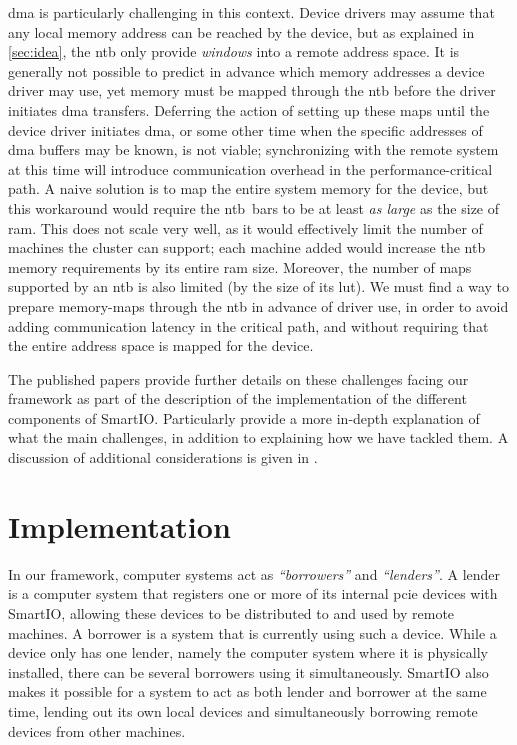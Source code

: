 \Gls{dma} is particularly challenging in this context.
%
Device drivers may assume that any local memory address can be reached by the device, but as explained in \cref{sec:idea}, the \gls{ntb} only provide \emph{windows} into a remote address space.
%
It is generally not possible to predict in advance which memory addresses a device driver may use, yet memory must be mapped through the \gls{ntb} before the driver initiates \gls{dma} transfers.
%
Deferring the action of setting up these maps until the device driver initiates \gls{dma}, or some other time when the specific addresses of \gls{dma} buffers may be known, is not viable;
%
synchronizing with the remote system at this time will introduce communication overhead in the performance-critical path.
%
A naive solution is to map the entire system memory for the device, but this workaround would require the \gls{ntb}~\glspl{bar} to be at least \emph{as large} as the size of \gls{ram}.
%
This does not scale very well, as it would effectively limit the number of machines the cluster can support;
%
each machine added would increase the \gls{ntb} memory requirements by its entire \gls{ram} size.
%
Moreover, the number of maps supported by an \gls{ntb} is also limited (by the size of its \gls{lut}).
%
We must find a way to prepare memory-maps through the \gls{ntb} in advance of driver use, in order to avoid adding communication latency in the critical path, and without requiring that the entire address space is mapped for the device.



The published papers provide further details on these challenges facing our framework as part of the description of the implementation of the different components of SmartIO.
%
Particularly  provide a more in-depth explanation of what the main challenges, in addition to explaining how we have tackled them.
%
A discussion of additional considerations is given in .




\section{Implementation}\label{sec:implementation}
In our framework, computer systems act as \emph{``\glspl{borrower}''} and \emph{``\glspl{lender}''}.
%
A \gls{lender} is a computer system that registers one or more of its internal \gls{pcie} devices with SmartIO, allowing these devices to be distributed to and used by remote machines.
%
A \gls{borrower} is a system that is currently using such a device. 
%
While a device only has one \gls{lender}, namely the computer system where it is physically installed, there can be several \glspl{borrower} using it simultaneously.
%
SmartIO also makes it possible for a system to act as both \gls{lender} and \gls{borrower} at the same time, lending out its own local devices and simultaneously borrowing remote devices from other machines.



